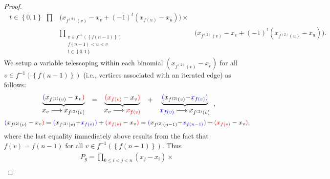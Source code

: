 \begin{proof}
\begin{equation}
\begin{array}{ccc}
{\begin{array}{c}
t\in\left\{ 0,1\right\} 
\end{array}}{\prod} & \bigg(x_{f^{\left(2\right)}\left(v\right)}-x_{v}+\left(-1\right)^{t}(x_{f\left(u\right)}-x_{u})\bigg)\times\\
 & \underset{\begin{array}{c}
v\in f^{-1}\left(\left\{ f\left(n-1\right)\right\} \right)\\
f\left(n-1\right)<u<v\\
t\in\left\{ 0,1\right\} 
\end{array}}{\prod} & \bigg(x_{f^{\left(2\right)}\left(v\right)}-x_{v}+\left(-1\right)^{t}(x_{f^{\left(2\right)}\left(u\right)}-x_{u})\bigg).
\end{array}
\end{equation}
We setup a variable {telescoping} within each binomial $(x_{f^{\left(2\right)}\left(v\right)}-x_{v})$
for all $v\in f^{-1}\left(\left\{ f\left(n-1\right)\right\} \right)$
(i.e., vertices associated with an iterated edge) as follows:
\[
\begin{array}{c}
\underbrace{{\color{blue}(}x_{f^{\left(2\right)}\left(v\right)}-x_{v}{\color{red})}}\\
x_{v}\longrightarrow x_{f^{\left(2\right)}\left(v\right)}
\end{array}\begin{array}{c}
=\\
\\
\end{array}\begin{array}{c}
\underbrace{{\color{red}(x_{f\left(v\right)}}-x_{v}{\color{red})}}\\
x_{v}\longrightarrow{\color{red}x_{f\left(v\right)}}
\end{array}\begin{array}{c}
+\\
\\
\end{array}\begin{array}{c}
\underbrace{{\color{blue}(}x_{f^{\left(2\right)}\left(v\right)}{\color{blue}-x_{f\left(v\right)}}{\color{blue})}}\\
{\color{blue}x_{f\left(v\right)}}\longrightarrow x_{f^{\left(2\right)}\left(v\right)}
\end{array},
\]
\[
{\color{blue}(}x_{f^{\left(2\right)}\left(v\right)}-x_{v}{\color{red})}={\color{blue}(}x_{f^{\left(2\right)}\left(v\right)}{\color{blue}-x_{f\left(v\right)}}{\color{blue})}+{\color{red}(x_{f\left(v\right)}}-x_{v}{\color{red})}={\color{blue}(}x_{f^{\left(2\right)}\left(n-1\right)}{\color{blue}-x_{f\left(n-1\right)}}{\color{blue})}+{\color{red}(x_{f\left(v\right)}}-x_{v}{\color{red})},
\]
where the last equality immediately above results from the fact that $f\left(v\right)=f\left(n-1\right)$
for all $v\in f^{-1}\left(\left\{ f(n-1)\right\} \right)$. Thus
\[
\begin{array}{c}
P_{g} = \underset{0 \le i < j < n}{\prod} \left(x_{j} - x_{i}\right) \times \\[10pt]


\end{array}\]
\end{proof}
